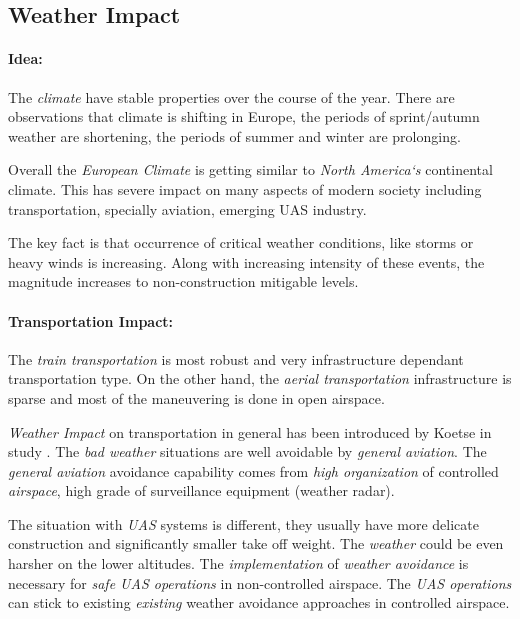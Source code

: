 \subsection{Weather Impact}\label{sec:WeatherImpact}

\paragraph{Idea:} The \emph{climate} have stable properties over the course of the year. There are observations that climate is shifting in Europe, the periods of sprint/autumn weather are shortening, the periods of summer and winter are prolonging. 

Overall the \emph{European Climate} is getting similar to \emph{North America`s} continental climate. This has severe impact on many aspects of modern society including transportation, specially aviation, emerging UAS industry. 

The key fact is that occurrence of critical weather conditions, like storms or heavy winds is increasing. Along with increasing intensity of these events, the magnitude increases to non-construction mitigable levels.

\paragraph{Transportation Impact:} The \emph{train transportation} is most robust and very infrastructure dependant transportation type. On the other hand, the \emph{aerial transportation} infrastructure is sparse and most of the maneuvering is done in open airspace. 

\emph{Weather Impact} on transportation in general has been introduced by Koetse in study \cite{koetse2009impact}. The \emph{bad weather} situations are well avoidable by \emph{general aviation}. The \emph{general aviation} avoidance capability comes from \emph{high organization} of controlled \emph{airspace}, high grade of surveillance equipment (weather radar).

The situation with \emph{UAS} systems is different, they usually have more delicate construction and significantly smaller take off weight. The \emph{weather} could be even harsher on the lower altitudes. The \emph{implementation} of \emph{weather avoidance} is necessary for \emph{safe UAS operations} in non-controlled airspace. The \emph{UAS operations} can stick to existing \emph{existing} weather avoidance approaches in controlled airspace. 

